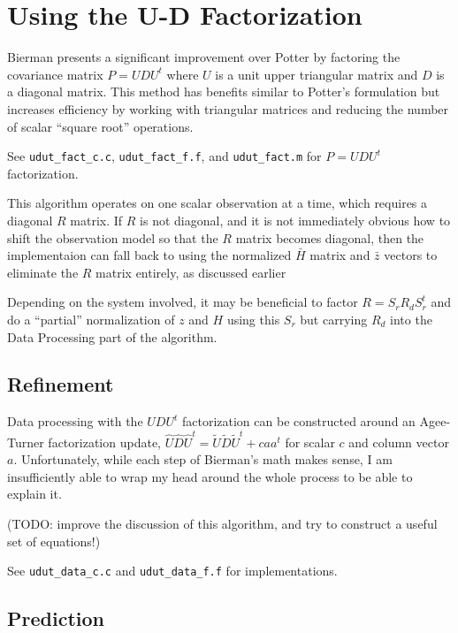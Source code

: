 \section{Using the U-D Factorization}

Bierman presents a significant improvement over Potter
by factoring the covariance matrix $P = U D U^t$
where $U$ is a unit upper triangular matrix and $D$
is a diagonal matrix.
This method has benefits similar to Potter's formulation but increases
efficiency by working with triangular matrices
and reducing the number of scalar ``square root'' operations.

See \verb|udut_fact_c.c|, \verb|udut_fact_f.f|,
and \verb|udut_fact.m|
for $P = U D U^t$ factorization.

This algorithm operates on one scalar observation at a time, which
requires a diagonal $R$ matrix. If $R$ is not diagonal,
and it is not immediately obvious how to shift the observation model
so that the $R$ matrix becomes diagonal,
then the implementaion can fall back to using
the normalized ${\bar H}$ matrix and ${\bar z}$ vectors
to eliminate the $R$ matrix entirely, as discussed earlier

Depending on the system involved,
it may be beneficial to factor $R = S_r R_d S_r^t$
and do a ``partial'' normalization of $z$ and $H$
using this $S_r$ but carrying $R_d$ into
the Data Processing part of the algorithm.

\subsection{Refinement}

Data processing with the $UDU^t$ factorization can be constructed
around an Agee-Turner factorization update,
${\hat U} {\hat D} {\hat U^t} = {\tilde U}{\tilde D}{\tilde U^t} + caa^t$
for scalar $c$ and column vector $a$.
Unfortunately, while each step of Bierman's math makes sense,
I am insufficiently able to wrap my head around the whole process
to be able to explain it.

(TODO: improve the discussion of this algorithm, and
try to construct a useful set of equations!)

See \verb|udut_data_c.c| and \verb|udut_data_f.f| for implementations.

\subsection{Prediction}

